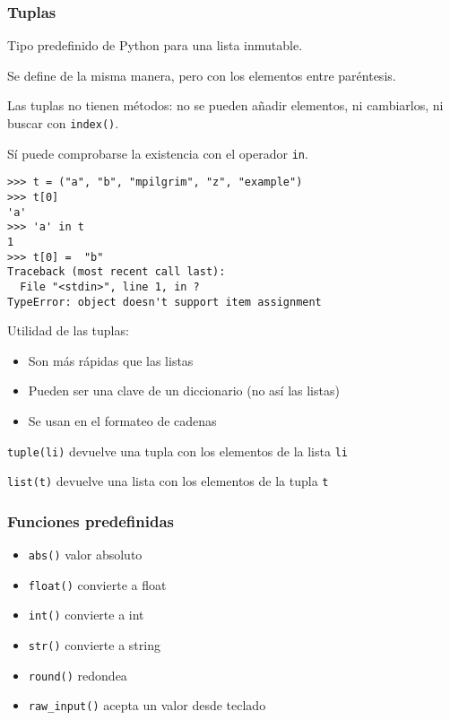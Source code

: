 \begin{frame}[fragile]
\frametitle{Tuplas}

Tipo predefinido de Python para una lista inmutable.

Se define de la misma manera, pero con los elementos entre paréntesis.

Las tuplas no tienen métodos: no se pueden añadir elementos, ni
cambiarlos, ni buscar con \verb|index()|.

Sí puede comprobarse la existencia con el operador \verb|in|.


\begin{footnotesize}
\begin{verbatim}
>>> t = ("a", "b", "mpilgrim", "z", "example") 
>>> t[0]                                       
'a'
>>> 'a' in t
1
>>> t[0] =  "b"
Traceback (most recent call last):
  File "<stdin>", line 1, in ?
TypeError: object doesn't support item assignment
\end{verbatim}
\end{footnotesize}

  
\end{frame}



\begin{frame}[fragile]

Utilidad de las tuplas:
\begin{itemize}
\item Son más rápidas que las listas
\item Pueden ser una clave de un diccionario (no así las listas)
\item Se usan en el formateo de cadenas
\end{itemize} 

\verb|tuple(li)| devuelve una tupla con los elementos de la lista \verb|li|

\verb|list(t)| devuelve una lista con los elementos de la tupla \verb|t|

\end{frame} 





\begin{frame}[fragile]
\frametitle{Funciones predefinidas}  
\begin{itemize}
  
\item 
\verb|abs()|   valor absoluto
\item 
\verb|float()|  convierte a float
\item 
\verb|int()|  convierte a int
\item 
\verb|str()|  convierte a string
\item 
\verb|round()|  redondea
\item 
\verb|raw_input()|  acepta un valor desde teclado


\end{itemize}
\end{frame}




